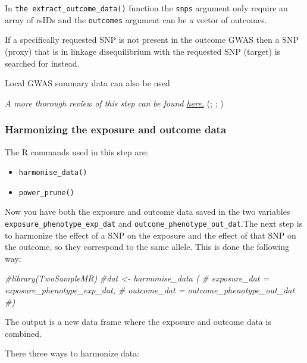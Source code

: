 \documentclass[
]{article}
\newenvironment{Shaded}{\begin{snugshade}}{\end{snugshade}}
\newcommand{\CommentTok}[1]{\textcolor[rgb]{0.56,0.35,0.01}{\textit{#1}}}
\providecommand{\tightlist}{%
  \setlength{\itemsep}{0pt}\setlength{\parskip}{0pt}}
\begin{document}
In \texttt{the\ extract\_outcome\_data()} function the \texttt{snps}
argument only require an array of rsIDs and the \texttt{outcomes}
argument can be a vector of outcomes.

If a specifically requested SNP is not present in the outcome GWAS then
a SNP (proxy) that is in linkage disequilibrium with the requested SNP
(target) is searched for instead.

Local GWAS summary data can also be used

\emph{A more thorough review of this step can be found
\href{https://mrcieu.github.io/TwoSampleMR/articles/outcome.html}{here.}}
(;
;
)

\subsubsection{Harmonizing the exposure and outcome
data}\label{harmonizing-the-exposure-and-outcome-data}

The R commands used in this step are:

\begin{itemize}
\tightlist
\item
  \texttt{harmonise\_data()}
\item
  \texttt{power\_prune()}
\end{itemize}

Now you have both the exposure and outcome data saved in the two
variables \texttt{exposure\_phenotype\_exp\_dat} and
\texttt{outcome\_phenotype\_out\_dat}.The next step is to harmonize the
effect of a SNP on the exposure and the effect of that SNP on the
outcome, so they correspond to the same allele. This is done the
following way:

\begin{Shaded}
\begin{Highlighting}[]
\CommentTok{\#library(TwoSampleMR)}
\CommentTok{\#dat \textless{}{-} harmonise\_data (}
\CommentTok{\#  exposure\_dat = exposure\_phenotype\_exp\_dat,}
\CommentTok{\#  outcome\_dat = outcome\_phenotype\_out\_dat}
\CommentTok{\#)}
\end{Highlighting}
\end{Shaded}

The output is a new data frame where the exposure and outcome data is
combined.

There three ways to harmonize data:
\end{document}
